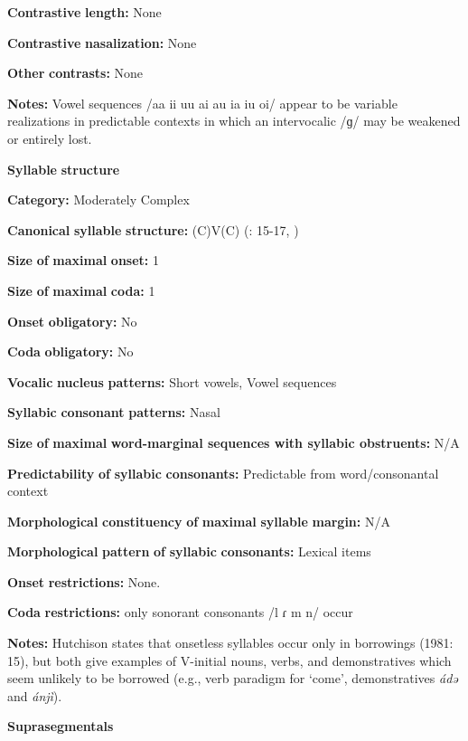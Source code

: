 \begin{styleBody}
\textbf{Contrastive} \textbf{length:} None

\textbf{Contrastive} \textbf{nasalization:} None

\textbf{Other} \textbf{contrasts:} None

\textbf{Notes:} Vowel sequences /aa ii uu ai au ia iu oi/ appear to be variable realizations in predictable contexts in which an intervocalic /ɡ/ may be weakened or entirely lost.

\textbf{Syllable} \textbf{structure}

\textbf{Category:} Moderately Complex

\textbf{Canonical} \textbf{syllable} \textbf{structure:} (C)V(C) (\citealt{Hutchison1981}: 15-17, \citealt{Cyffer1998})

\textbf{Size} \textbf{of} \textbf{maximal} \textbf{onset:} 1

\textbf{Size} \textbf{of} \textbf{maximal} \textbf{coda:} 1

\textbf{Onset} \textbf{obligatory:} No

\textbf{Coda} \textbf{obligatory:} No

\textbf{Vocalic} \textbf{nucleus} \textbf{patterns:} Short vowels, Vowel sequences

\textbf{Syllabic} \textbf{consonant} \textbf{patterns:} Nasal

\textbf{Size} \textbf{of} \textbf{maximal} \textbf{word{}-marginal sequences with syllabic obstruents:} N/A

\textbf{Predictability} \textbf{of} \textbf{syllabic} \textbf{consonants:} Predictable from word/consonantal context

\textbf{Morphological} \textbf{constituency} \textbf{of} \textbf{maximal} \textbf{syllable} \textbf{margin:} N/A

\textbf{Morphological} \textbf{pattern} \textbf{of} \textbf{syllabic} \textbf{consonants:} Lexical items

\textbf{Onset} \textbf{restrictions:} None.

\textbf{Coda} \textbf{restrictions:} only sonorant consonants /l ɾ m n/ occur \citep[15]{Hutchison1981}

\textbf{Notes:} Hutchison states that onsetless syllables occur only in borrowings (1981: 15), but both \citet{HutchisonCyffer1998} give examples of V-initial nouns, verbs, and demonstratives which seem unlikely to be borrowed (e.g., verb paradigm for ‘come’, demonstratives \textit{ádə} and \textit{ánjì}).

\textbf{Suprasegmentals}


\end{styleBody}
